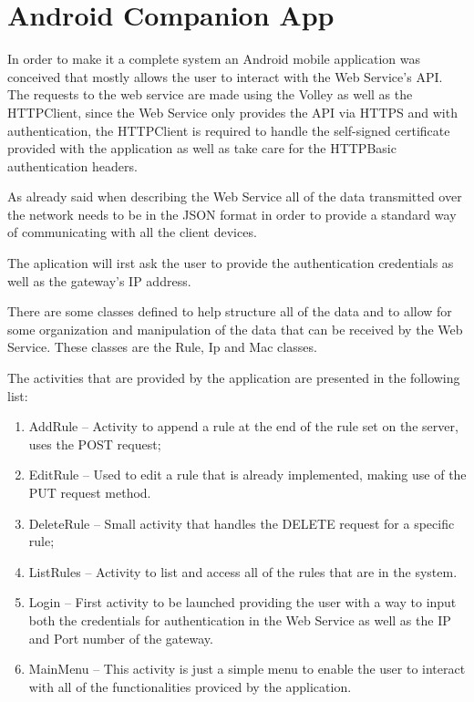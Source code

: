 {\section{Android Companion App}
\label{chap4:sec:android}
In order to make it a complete system an Android mobile application was
conceived that mostly allows the user to interact with the Web Service's API.
The requests to the web service are made using the Volley as well as the
HTTPClient, since the Web Service only provides the API via HTTPS and with
authentication, the HTTPClient is required to handle the self-signed certificate
provided with the application as well as take care for the HTTPBasic
authentication headers.

As already said when describing the Web Service all of the data transmitted over
the network needs to be in the JSON format in order to provide a standard way of
communicating with all the client devices.

The aplication will irst ask the user to provide the authentication credentials
as well as the gateway's IP address.


There are some classes defined to help structure all of the data and to allow
for some organization and manipulation of the data that can be received by the
Web Service. These classes are the Rule, Ip and Mac classes.

The activities that are provided by the application are presented in the
following list:
\begin{enumerate}
	\item AddRule -- Activity to append a rule at the end of the rule set on the
		server, uses the POST request;
	\item EditRule -- Used to edit a rule that is already implemented, making
		use of the PUT request method.
	\item DeleteRule -- Small activity that handles the DELETE request for a
		specific rule;
	\item ListRules -- Activity to list and access all of the rules that are in
		the system.
	\item Login -- First activity to be launched providing the user with a way
		to input both the credentials for authentication in the Web Service as
		well as the IP and Port number of the gateway.
	\item MainMenu -- This activity is just a simple menu to enable the user to
		interact with all of the functionalities proviced by the application.
\end{enumerate}

}
